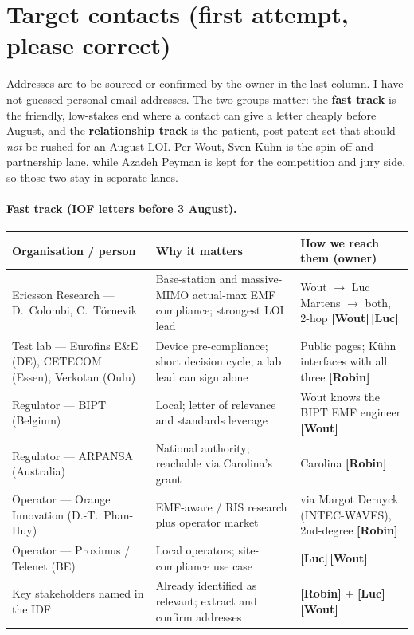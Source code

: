 \documentclass[11pt,a4paper]{article}
\newcommand{\owner}[1]{\textbf{[#1]}}
\begin{document}
\section{Target contacts (first attempt, please correct)}
Addresses are to be sourced or confirmed by the owner in the last column. I have not guessed personal email
addresses. The two groups matter: the \textbf{fast track} is the friendly, low-stakes end where a contact can
give a letter cheaply before August, and the \textbf{relationship track} is the patient, post-patent set that
should \emph{not} be rushed for an August LOI. Per Wout, Sven K\"uhn is the spin-off and partnership lane,
while Azadeh Peyman is kept for the competition and jury side, so those two stay in separate lanes.

\paragraph{Fast track (IOF letters before 3 August).}
\begin{tabularx}{\textwidth}{@{}p{3.0cm} X p{3.9cm}@{}}
\toprule
\textbf{Organisation / person} & \textbf{Why it matters} & \textbf{How we reach them (owner)} \\
\midrule
Ericsson Research --- D.\ Colombi, C.\ T\"ornevik & Base-station and massive-MIMO actual-max EMF compliance; strongest LOI lead & Wout $\to$ Luc Martens $\to$ both, 2-hop \owner{Wout}\,\owner{Luc} \\
Test lab --- Eurofins E\&E (DE), CETECOM (Essen), Verkotan (Oulu) & Device pre-compliance; short decision cycle, a lab lead can sign alone & Public pages; K\"uhn interfaces with all three \owner{Robin} \\
Regulator --- BIPT (Belgium) & Local; letter of relevance and standards leverage & Wout knows the BIPT EMF engineer \owner{Wout} \\
Regulator --- ARPANSA (Australia) & National authority; reachable via Carolina's grant & Carolina \owner{Robin} \\
Operator --- Orange Innovation (D.-T.\ Phan-Huy) & EMF-aware / RIS research plus operator market & via Margot Deruyck (INTEC-WAVES), 2nd-degree \owner{Robin} \\
Operator --- Proximus / Telenet (BE) & Local operators; site-compliance use case & \owner{Luc}\,\owner{Wout} \\
Key stakeholders named in the IDF & Already identified as relevant; extract and confirm addresses & \owner{Robin} + \owner{Luc}\,\owner{Wout} \\
\bottomrule
\end{tabularx}
\end{document}
